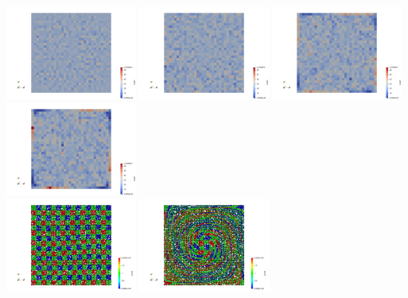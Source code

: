 \begin{center}
\includegraphics[width=4.3cm]{python_codes/fieldstone_30/results_dh/count0000}
\includegraphics[width=4.3cm]{python_codes/fieldstone_30/results_dh/count0010}
\includegraphics[width=4.3cm]{python_codes/fieldstone_30/results_dh/count0040}
\includegraphics[width=4.3cm]{python_codes/fieldstone_30/results_dh/count0070}\\
\includegraphics[width=4.3cm]{python_codes/fieldstone_30/results_dh/mmm0000}
\includegraphics[width=4.3cm]{python_codes/fieldstone_30/results_dh/mmm0010}

\end{center}
